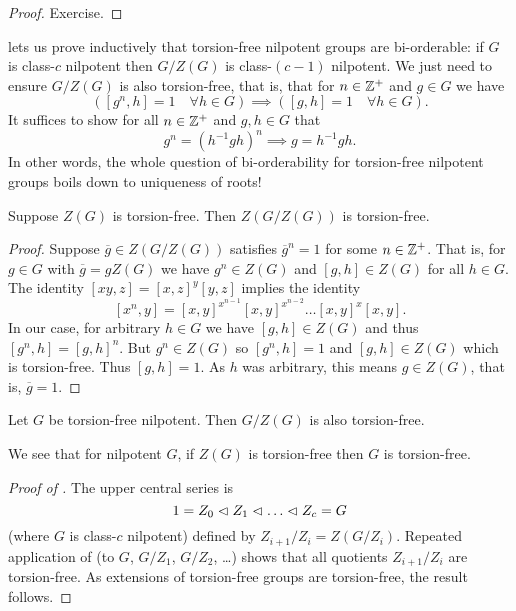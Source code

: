 \begin{proof}
    Exercise.
\end{proof}

 lets us prove inductively that torsion-free nilpotent groups are bi-orderable:
if $G$ is class-$c$ nilpotent then $G / Z(G)$ is class-$(c-1)$ nilpotent.
We just need to ensure $G / Z(G)$ is also torsion-free, that is, that for $n \in \mathbb{Z}^+$ and $g \in G$ we have \[
    ( [g^n, h] = 1 \quad \forall h \in G ) \implies ( [g, h] = 1 \quad \forall h \in G ).
\]
It suffices to show for all $n \in \mathbb{Z}^+$ and $g, h \in G$ that \[
    g^n = (h^{-1} g h)^n \implies g = h^{-1} g h.
\]
In other words, the whole question of bi-orderability for torsion-free nilpotent groups boils down to uniqueness of roots!

\begin{lemma}
    \label{lemma:quotient_by_tf_centre}
    Suppose $Z(G)$ is torsion-free.
    Then $Z(G / Z(G))$ is torsion-free.
\end{lemma}

\begin{proof}
    Suppose $\overline{g} \in Z(G / Z(G))$ satisfies $\overline{g}^n = 1$ for some $n \in \mathbb{Z}^+$.
    That is, for $g \in G$ with $\overline{g} = g Z(G)$ we have $g^n \in Z(G)$ and $[g, h] \in Z(G)$ for all $h \in G$.
    The identity $[xy, z] = [x, z]^y [y, z]$ implies the identity \[
        [x^n, y] = [x, y]^{x^{n-1}} [x, y]^{x^{n-2}} \dots [x, y]^x [x, y].
    \]
    In our case, for arbitrary $h \in G$ we have $[g, h] \in Z(G)$ and thus $[g^n, h] = [g, h]^n$.
    But $g^n \in Z(G)$ so $[g^n, h] = 1$ and $[g, h] \in Z(G)$ which is torsion-free.
    Thus $[g, h] = 1$.
    As $h$ was arbitrary, this means $g \in Z(G)$, that is, $\overline{g} = 1$.
\end{proof}

\begin{corollary}
    \label{corollary:nilpotent_quotient_torsion_free}
    Let $G$ be torsion-free nilpotent.
    Then $G / Z(G)$ is also torsion-free.
\end{corollary}

\begin{remark}
    We see that for nilpotent $G$, if $Z(G)$ is torsion-free then $G$ is torsion-free.
\end{remark}

\begin{proof}[Proof of ]
    The upper central series is \[
        1 = Z_0 \normal Z_1 \normal \dots \normal Z_c = G
    \] (where $G$ is class-$c$ nilpotent) defined by $Z_{i+1} / Z_i = Z(G / Z_i)$.
    Repeated application of  (to $G$, $G / Z_1$, $G / Z_2$, \dots) shows that all quotients $Z_{i+1} / Z_i$ are torsion-free.
    As extensions of torsion-free groups are torsion-free, the result follows.
\end{proof}

